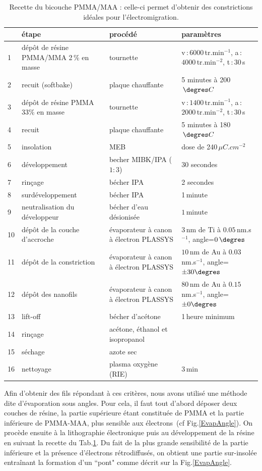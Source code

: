 \begin{table}
\begin{center}
\begin{tabular}{|p{0.5cm}|p{4cm}|p{4cm}|p{3cm}|}
  \hline
\,& \textbf{étape} & \textbf{procédé} & \textbf{paramètres} \tabularnewline
\hline
1 &  dép\^ot de résine PMMA/MMA 2\,\% en masse & tournette & v\,:\,$6000\,$tr.min$^{-1}$, a\,:\,$4000\,$tr.min$^{-2}$, t\,:\,$30\,$s 
\tabularnewline
\hline
 2 & recuit (softbake) & plaque chauffante  & 5 minutes à 200$\, \degres C$ 
\tabularnewline
\hline
 3 & dépôt de résine PMMA 33\% en masse & tournette & v\,:\,$1400\,$tr.min$^{-1}$, a\,:\,$2000\,$tr.min$^{-2}$, t\,:\,$30\,$s \tabularnewline
\hline
4 & recuit & plaque chauffante & 5 minutes à 180$\, \degres C$
\tabularnewline
\hline
5 & insolation & MEB & dose de 240\,$\mu C.cm^{-2}$
\tabularnewline
\hline
6 & développement & becher MIBK/IPA ($1:3$) & 30 secondes
\tabularnewline
\hline
7 & rinçage & bécher IPA & 2 secondes
\tabularnewline
\hline
8 & surdéveloppement & bécher IPA & 1\,minute
\tabularnewline
\hline
9 & neutralisation du développeur &bécher d'eau désionisée & $1\,$minute\tabularnewline
\hline
10 & dép\^ot de la couche d'accroche & évaporateur à canon à électron PLASSYS & $3\,$nm de Ti à $0.05\,$nm.s$^{-1}$, angle=$0\,\degres$
\tabularnewline
\hline
11 & dépôt de la constriction & évaporateur à canon à électron PLASSYS & $10\,$nm de Au à $0.03\,$nm.s$^{-1}$, angle=$\pm 30\degres$
\tabularnewline
\hline
12 &  dépôt des nanofils &  évaporateur à canon à électron PLASSYS  &  $80\,$nm de Au à $0.15\,$nm.s$^{-1}$, angle=$\pm 0\degres$
\tabularnewline
\hline
 13 & lift-off & bécher d'acétone & 1\,heure minimum 
\tabularnewline
\hline
14 & rinçage & acétone, éthanol et isopropanol & 
\tabularnewline
\hline
15 & séchage & azote sec & 
\tabularnewline
\hline
16 & nettoyage & plasma oxygène (RIE)& $3\,$min\tabularnewline
\hline
\end{tabular}
\caption{Recette du bicouche PMMA/MAA : celle-ci permet d'obtenir des constrictions idéales pour l'électromigration.}
\label{tab_recette_elec}
\end{center}
\end{table}


Afin d'obtenir des fils répondant à ces critères, nous avons utilisé une méthode dite d'évaporation sous angles. Pour cela, il faut tout d'abord déposer deux couches de résine, la partie supérieure étant constituée de PMMA et la partie inférieure de PMMA-MAA, plus sensible aux électrons~(cf Fig.\ref{EvapAngle}). On procède ensuite à la lithographie électronique puis au développement de la résine en suivant la recette du Tab.\ref{tab_recette_elec}. Du fait de la plus grande sensibilité de la partie inférieure et la présence d'électrons rétrodiffusés, on obtient une partie sur-insolée entraînant la formation d'un ``pont" comme décrit sur la Fig.\ref{EvapAngle}.


